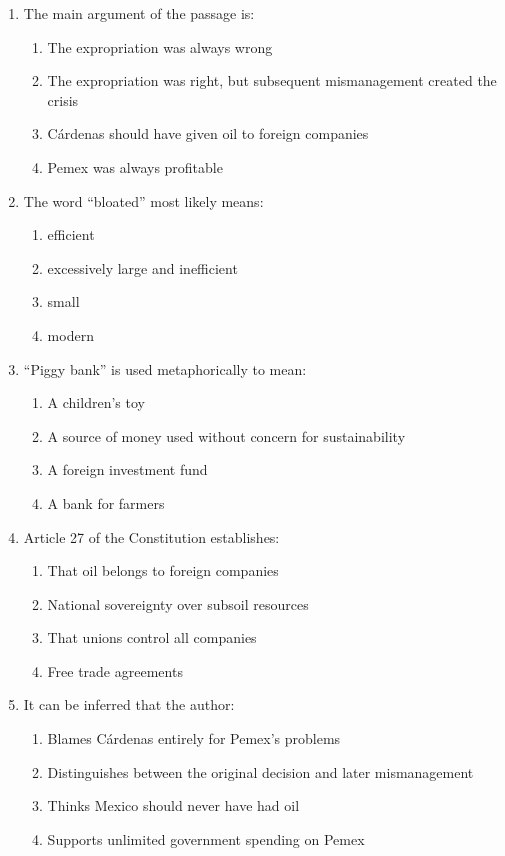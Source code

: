 \documentclass[10pt,a4paper]{article}
\begin{document}
\begin{enumerate}[label=\textbf{\arabic*.}]
\item The main argument of the passage is:
\begin{enumerate}[label=(\Alph*)]
\item The expropriation was always wrong
\item The expropriation was right, but subsequent mismanagement
created the crisis
\item C\'ardenas should have given oil to foreign companies
\item Pemex was always profitable
\end{enumerate}

\item The word ``bloated'' most likely means:
\begin{enumerate}[label=(\Alph*)]
\item efficient \item excessively large and inefficient
\item small \item modern
\end{enumerate}

\item ``Piggy bank'' is used metaphorically to mean:
\begin{enumerate}[label=(\Alph*)]
\item A children's toy
\item A source of money used without concern for sustainability
\item A foreign investment fund
\item A bank for farmers
\end{enumerate}

\item Article 27 of the Constitution establishes:
\begin{enumerate}[label=(\Alph*)]
\item That oil belongs to foreign companies
\item National sovereignty over subsoil resources
\item That unions control all companies
\item Free trade agreements
\end{enumerate}

\item It can be inferred that the author:
\begin{enumerate}[label=(\Alph*)]
\item Blames C\'ardenas entirely for Pemex's problems
\item Distinguishes between the original decision and later mismanagement
\item Thinks Mexico should never have had oil
\item Supports unlimited government spending on Pemex
\end{enumerate}
\end{enumerate}
\end{document}
